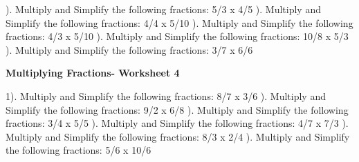 \documentclass{article}%
\begin{document}
\newline%
). Multiply and Simplify the following fractions: 5/3 x 4/5%
\newline%
\newline%
). Multiply and Simplify the following fractions: 4/4 x 5/10%
\newline%
\newline%
). Multiply and Simplify the following fractions: 4/3 x 5/10%
\newline%
\newline%
). Multiply and Simplify the following fractions: 10/8 x 5/3%
\newline%
\newline%
). Multiply and Simplify the following fractions: 3/7 x 6/6%
\newline%
\newline%
\newline%
\pagebreak%
\large%
\begin{center}%
\textbf{Multiplying Fractions- Worksheet 4}%
\newline%
\end{center} \normalsize%
1). Multiply and Simplify the following fractions: 8/7 x 3/6%
\newline%
\newline%
). Multiply and Simplify the following fractions: 9/2 x 6/8%
\newline%
\newline%
). Multiply and Simplify the following fractions: 3/4 x 5/5%
\newline%
\newline%
). Multiply and Simplify the following fractions: 4/7 x 7/3%
\newline%
\newline%
). Multiply and Simplify the following fractions: 8/3 x 2/4%
\newline%
\newline%
). Multiply and Simplify the following fractions: 5/6 x 10/6%
\newline%
\newline%
\end{document}
